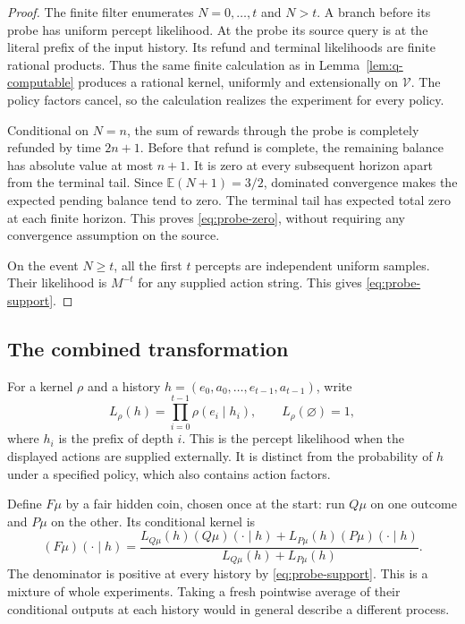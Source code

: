 \documentclass[11pt]{article}
\theoremstyle{definition}
\theoremstyle{remark}
\newcommand{\V}{\mathcal V}
\newcommand{\Exp}{\mathbb E}
\begin{document}
\begin{proof}
The finite filter enumerates $N=0,\ldots,t$ and $N>t$.  A branch
before its probe has uniform percept likelihood.  At the probe its
source query is at the literal prefix of the input history.  Its
refund and terminal likelihoods are finite rational products.  Thus
the same finite calculation as in Lemma~\ref{lem:q-computable}
produces a rational kernel, uniformly and extensionally on $\V$.
The policy factors cancel, so the calculation realizes the experiment
for every policy.

Conditional on $N=n$, the sum of rewards through the probe is
completely refunded by time $2n+1$.  Before that refund is complete,
the remaining balance has absolute value at most $n+1$.  It is zero
at every subsequent horizon apart from the terminal tail.  Since
$\Exp(N+1)=3/2$, dominated convergence makes the expected pending
balance tend to zero.  The terminal tail has expected total zero at
each finite horizon.  This proves \eqref{eq:probe-zero}, without
requiring any convergence assumption on the source.

On the event $N\ge t$, all the first $t$ percepts are independent
uniform samples.  Their likelihood is $M^{-t}$ for any supplied
action string.  This gives \eqref{eq:probe-support}.
\end{proof}

\subsection{The combined transformation}

For a kernel $\rho$ and a history
$h=(e_0,a_0,\ldots,e_{t-1},a_{t-1})$, write
\begin{equation}
  L_\rho(h)=\prod_{i=0}^{t-1}\rho(e_i\mid h_i),
  \qquad L_\rho(\varnothing)=1,
  \label{eq:likelihood}
\end{equation}
where $h_i$ is the prefix of depth $i$.  This is the percept likelihood
when the displayed actions are supplied externally.  It is distinct
from the probability of $h$ under a specified policy, which also
contains action factors.

Define $F\mu$ by a fair hidden coin, chosen once at the start: run
$Q\mu$ on one outcome and $P\mu$ on the other.  Its conditional kernel
is
\begin{equation}
 (F\mu)(\cdot\mid h)=
 \frac{L_{Q\mu}(h)(Q\mu)(\cdot\mid h)
       +L_{P\mu}(h)(P\mu)(\cdot\mid h)}
      {L_{Q\mu}(h)+L_{P\mu}(h)}.
 \label{eq:f-mixture}
\end{equation}
The denominator is positive at every history by
\eqref{eq:probe-support}.  This is a mixture of whole experiments.
Taking a fresh pointwise average of their conditional outputs at each
history would in general describe a different process.
\end{document}

